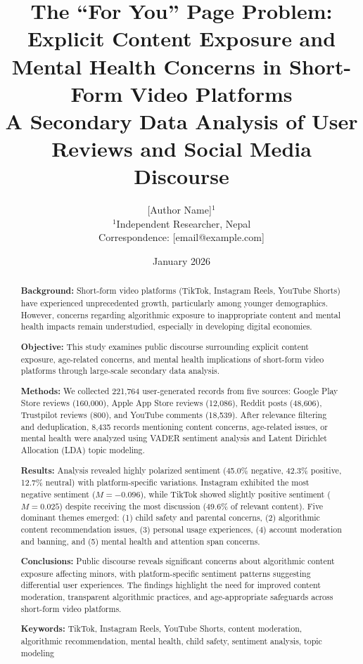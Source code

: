 \documentclass[12pt,a4paper]{article}
\title{\textbf{The ``For You'' Page Problem: Explicit Content Exposure and Mental Health Concerns in Short-Form Video Platforms}\\[0.5cm]
\large A Secondary Data Analysis of User Reviews and Social Media Discourse}
\author{
    [Author Name]$^{1}$\\[0.2cm]
    \small $^{1}$Independent Researcher, Nepal\\[0.2cm]
    \small Correspondence: [email@example.com]
}
\date{January 2026}
\begin{document}
\maketitle

\begin{abstract}
\noindent
\textbf{Background:} Short-form video platforms (TikTok, Instagram Reels, YouTube Shorts) have experienced unprecedented growth, particularly among younger demographics. However, concerns regarding algorithmic exposure to inappropriate content and mental health impacts remain understudied, especially in developing digital economies.

\textbf{Objective:} This study examines public discourse surrounding explicit content exposure, age-related concerns, and mental health implications of short-form video platforms through large-scale secondary data analysis.

\textbf{Methods:} We collected 221,764 user-generated records from five sources: Google Play Store reviews (160,000), Apple App Store reviews (12,086), Reddit posts (48,606), Trustpilot reviews (800), and YouTube comments (18,539). After relevance filtering and deduplication, 8,435 records mentioning content concerns, age-related issues, or mental health were analyzed using VADER sentiment analysis and Latent Dirichlet Allocation (LDA) topic modeling.

\textbf{Results:} Analysis revealed highly polarized sentiment (45.0\% negative, 42.3\% positive, 12.7\% neutral) with platform-specific variations. Instagram exhibited the most negative sentiment ($M = -0.096$), while TikTok showed slightly positive sentiment ($M = 0.025$) despite receiving the most discussion (49.6\% of relevant content). Five dominant themes emerged: (1) child safety and parental concerns, (2) algorithmic content recommendation issues, (3) personal usage experiences, (4) account moderation and banning, and (5) mental health and attention span concerns.

\textbf{Conclusions:} Public discourse reveals significant concerns about algorithmic content exposure affecting minors, with platform-specific sentiment patterns suggesting differential user experiences. The findings highlight the need for improved content moderation, transparent algorithmic practices, and age-appropriate safeguards across short-form video platforms.

\vspace{0.3cm}
\noindent\textbf{Keywords:} TikTok, Instagram Reels, YouTube Shorts, content moderation, algorithmic recommendation, mental health, child safety, sentiment analysis, topic modeling
\end{abstract}
\end{document}
